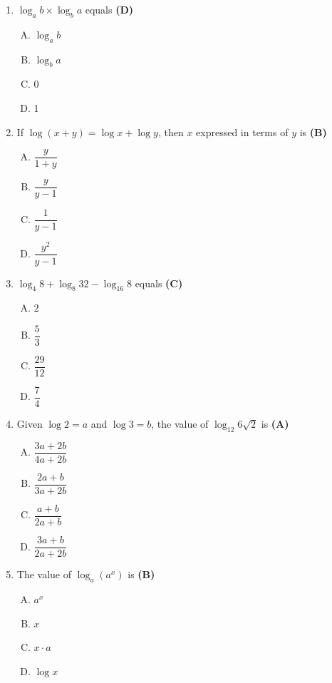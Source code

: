 \documentclass[10pt,a4paper]{article}
\begin{document}
\begin{enumerate}[1.]
\item $\log_a b \times \log_b a$ equals \hfill \textbf{(D)}
\begin{enumerate}[(A)]
    \item $\log_a b$
    \item $\log_b a$
    \item 0
    \item 1
\end{enumerate}

\item If $\log(x+y) = \log x + \log y$, then $x$ expressed in terms of $y$ is \hfill \textbf{(B)}
\begin{enumerate}[(A)]
    \item $\dfrac{y}{1+y}$
    \item $\dfrac{y}{y-1}$
    \item $\dfrac{1}{y-1}$
    \item $\dfrac{y^2}{y-1}$
\end{enumerate}

\item $\log_4 8 + \log_8 32 - \log_{16} 8$ equals \hfill \textbf{(C)}
\begin{enumerate}[(A)]
    \item $2$
    \item $\dfrac{5}{3}$
    \item $\dfrac{29}{12}$
    \item $\dfrac{7}{4}$
\end{enumerate}

\item Given $\log 2 = a$ and $\log 3 = b$, the value of $\log_{12} 6\sqrt{2}$ is \hfill \textbf{(A)}
\begin{enumerate}[(A)]
    \item $\dfrac{3a+2b}{4a+2b}$
    \item $\dfrac{2a+b}{3a+2b}$
    \item $\dfrac{a+b}{2a+b}$
    \item $\dfrac{3a+b}{2a+2b}$
\end{enumerate}

\item The value of $\log_a(a^x)$ is \hfill \textbf{(B)}
\begin{enumerate}[(A)]
    \item $a^x$
    \item $x$
    \item $x \cdot a$
    \item $\log x$
\end{enumerate}


\end{enumerate}
\end{document}
